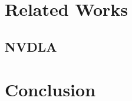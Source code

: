 \documentclass[12pt,conference]{IEEEtran}
\begin{document}
\section{Related Works}
\blindtext
\subsection{NVDLA}
\blindtext

\section{Conclusion}
\blindtext

\blindtext











\end{document}
